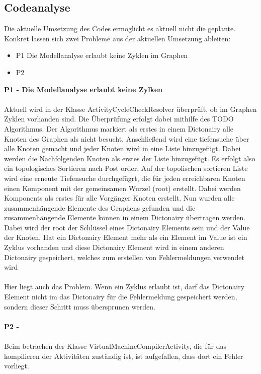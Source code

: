 \documentclass{article}
\begin{document}
    \subsection{Codeanalyse}
    \label{Codeanalyse}
        Die aktuelle Umsetzung des Codes ermöglicht es aktuell nicht die geplante. Konkret lassen sich zwei Probleme aus der aktuellen Umsetzung ableiten:
        \begin{itemize}
            \item P1 Die Modellanalyse erlaubt keine Zyklen im Graphen
            \item P2 
        \end{itemize}
        \textbf{P1 - Die Modellanalyse erlaubt keine Zylken}\\
        \\
        Aktuell wird in der Klasse ActivityCycleCheckResolver überprüft, ob im Graphen Zyklen vorhanden sind. Die Überprüfung erfolgt dabei mithilfe des TODO Algorithmus.
        Der Algorithmus markiert als erstes in einem Dictonairy alle Knoten des Graphen als nicht besucht. 
        Anschließend wird eine tiefensuche über alle Knoten gemacht und jeder Knoten wird in eine Liste hinzugefügt. Dabei werden die Nachfolgenden Knoten als erstes der Liste hinzugefügt. Es erfolgt also ein topologisches Sortieren nach Post order.
        Auf der topolischen sortieren Liste wird eine erneute Tiefensuche durchgefügrt, die für jeden erreichbaren Knoten einen Komponent mit der gemeinsamen Wurzel (root) erstellt. Dabei werden Komponents als erstes für alle Vorgänger Knoten erstellt.
        Nun wurden alle zusammenhängende Elemente des Graphens gefunden und die zusammenhängende Elemente können in einem Dictonairy übertragen werden. Dabei wird der root der Schlüssel eines Dictonairy Elements sein und der Value der Knoten. 
        Hat ein Dictonairy Element mehr als ein Element im Value ist ein Zyklus vorhanden und diese Dictonairy Element wird in einem anderen Dictonairy gespeichert, welches zum erstellen von Fehlermeldungen verwendet wird\\
        \\
        Hier liegt auch das Problem. Wenn ein Zyklus erlaubt ist, darf das Dictonairy Element nicht im das Dictonairy für die Fehlermeldung gespeichert werden, sondern dieser Schritt muss übersprunen werden.\\
        \\
        \textbf{P2 -}\\
        \\
        Beim betrachen der Klasse VirtualMachineCompilerActivity, die für das kompilieren der Aktivitäten zuständig ist, ist aufgefallen, dass dort ein Fehler vorliegt.
        
\end{document}

